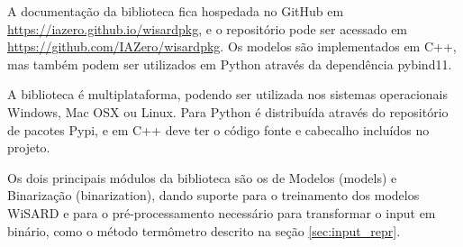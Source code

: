 A documentação da biblioteca fica hospedada no GitHub em \url{https://iazero.github.io/wisardpkg}, e o repositório pode ser acessado em \url{https://github.com/IAZero/wisardpkg}. Os modelos são implementados em C++, mas também podem ser utilizados em Python através da dependência pybind11.

A biblioteca é multiplataforma, podendo ser utilizada nos sistemas operacionais Windows, Mac OSX ou Linux. Para Python é distribuída através do repositório de pacotes Pypi, e em C++ deve ter o código fonte e cabecalho incluídos no projeto.

Os dois principais módulos da biblioteca são os de Modelos (models) e Binarização (binarization), dando suporte para o treinamento dos modelos WiSARD e para o pré-processamento necessário para transformar o input em binário, como o método termômetro descrito na seção \ref{sec:input_repr}.